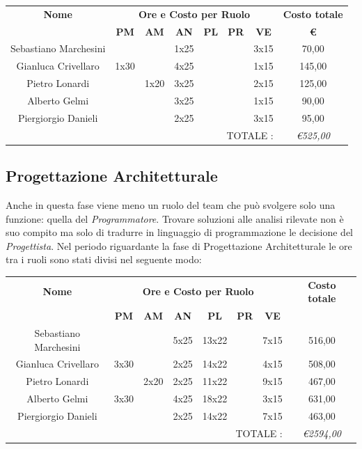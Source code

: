 \documentclass[12pt,a4paper,titlepage]{article}
\begin{document}
{\renewcommand\arraystretch{1.2} %
	\begin{tabular}{|c|c|c|c|c|c|c|c|}
		\hline 
		\textbf{Nome} & \multicolumn{6}{c|}{\textbf{Ore e Costo per Ruolo}} & \textbf{Costo totale} \\ 
		& \textbf{PM} & \textbf{AM} & \textbf{AN} & \textbf{PL} & \textbf{PR} & \textbf{VE} & \textbf{ \euro } \\ 
		\hline
		Sebastiano Marchesini & & & 1x25 & & & 3x15 & 70,00 \\ 
		\hline 
		Gianluca Crivellaro & 1x30 & & 4x25 & & & 1x15 & 145,00 \\ 
		\hline 
		Pietro Lonardi & & 1x20 & 3x25 & & & 2x15 & 125,00 \\ 
		\hline 
		Alberto Gelmi & & & 3x25 & & & 1x15 & 90,00 \\ 
		\hline 
		Piergiorgio Danieli & & & 2x25 & & & 3x15 & 95,00 \\ 
		\hline 
		\multicolumn{7}{r|}{TOTALE :} & \textit{\euro 525,00} \\ 
\end{tabular}} 

\subsection{Progettazione Architetturale}
Anche in questa fase viene meno un ruolo del team che può svolgere solo una funzione: quella del \textit{Programmatore}. Trovare soluzioni alle analisi rilevate non è suo compito ma solo di tradurre in linguaggio di programmazione le decisione del \textit{Progettista}.
Nel periodo riguardante la fase di Progettazione Architetturale le ore tra i ruoli sono stati divisi nel seguente modo:\\

{\renewcommand\arraystretch{1.2} %
	\begin{tabular}{|c|c|c|c|c|c|c|c|}
		\hline 
		\textbf{Nome} & \multicolumn{6}{c|}{\textbf{Ore e Costo per Ruolo}} & \textbf{Costo totale} \\ 
		& \textbf{PM} & \textbf{AM} & \textbf{AN} & \textbf{PL} & \textbf{PR} & \textbf{VE} & \textbf{ } \\ 
		\hline 
		Sebastiano Marchesini & & & 5x25 & 13x22 & & 7x15 & 516,00 \\ 
		\hline 
		Gianluca Crivellaro & 3x30 & & 2x25 & 14x22 & & 4x15 & 508,00 \\ 
		\hline 
		Pietro Lonardi & & 2x20 & 2x25 & 11x22 & & 9x15 & 467,00 \\ 
		\hline 
		Alberto Gelmi & 3x30 & & 4x25 & 18x22 & & 3x15 & 631,00 \\ 
		\hline 
		Piergiorgio Danieli & & & 2x25 & 14x22 & & 7x15 & 463,00 \\ 
		\hline 
		\multicolumn{7}{r|}{TOTALE :} & \textit{\euro 2594,00} \\ 
\end{tabular}} 
\end{document}
